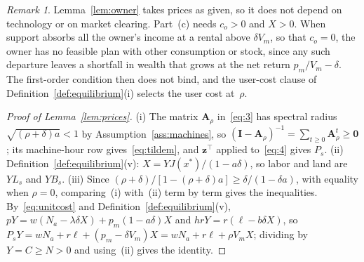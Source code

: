 \documentclass[12pt]{article}
\theoremstyle{plain}
\theoremstyle{definition}
\theoremstyle{remark}
\newtheorem*{remark}{Remark}
\begin{document}
\begin{remark}
Lemma~\ref{lem:owner} takes prices as given, so it does not depend on technology or on market clearing. Part~(c) needs $c_o>0$ and $X>0$. When support absorbs all the owner's income at a rental above $\delta V_m$, so that $c_o=0$, the owner has no feasible plan with other consumption or stock, since any such departure leaves a shortfall in wealth that grows at the net return $p_m/V_m-\delta$. The first-order condition then does not bind, and the user-cost clause of Definition~\ref{def:equilibrium}(i) selects the user cost at~$\rho$.
\end{remark}

\begin{proof}[Proof of Lemma~\ref{lem:prices}]
(i) The matrix $\mathbf A_\rho$ in~\eqref{eq:3} has spectral radius $\sqrt{(\rho+\delta)a}<1$ by Assumption~\ref{ass:machines}, so $(\mathbf I-\mathbf A_\rho)^{-1}=\sum_{t\ge0}\mathbf A_\rho^t\ge\mathbf 0$; its machine-hour row gives~\eqref{eq:tildem}, and $\mathbf z^{\top}$ applied to~\eqref{eq:4} gives $P_s$. (ii) Definition~\ref{def:equilibrium}(v): $X=YJ(x^*)/(1-a\delta)$, so labor and land are $YL_s$ and $YB_s$. (iii) Since $(\rho+\delta)/[1-(\rho+\delta)a]\ge\delta/(1-\delta a)$, with equality when $\rho=0$, comparing~(i) with~(ii) term by term gives the inequalities. By~\eqref{eq:unitcost} and Definition~\ref{def:equilibrium}(v), $pY=w(N_a-\lambda\delta X)+p_m(1-a\delta)X$ and $hrY=r(\ell-b\delta X)$, so $P_sY=wN_a+r\ell+(p_m-\delta V_m)X=wN_a+r\ell+\rho V_mX$; dividing by $Y=C\ge N>0$ and using~(ii) gives the identity.
\end{proof}
\end{document}
